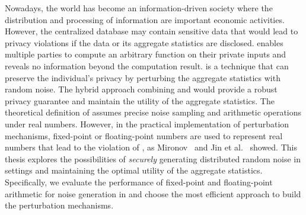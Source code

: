 Nowadays, the world has become an information-driven society where the distribution and processing of information are important economic activities.
However, the centralized database may contain sensitive data that would lead to privacy violations if the data or its aggregate statistics are disclosed.
\smpc enables multiple parties to compute an arbitrary function on their private inputs and reveals no information beyond the computation result.
\differentialprivacy is a technique that can preserve the individual's privacy by perturbing the aggregate statistics with random noise.
The hybrid approach combining \smpc and \differentialprivacy would provide a robust privacy guarantee and maintain the utility of the aggregate statistics.
The theoretical definition of \differentialprivacy assumes precise noise sampling and arithmetic operations under real numbers. However, in the practical implementation of perturbation mechanisms, fixed-point or floating-point numbers are used to represent real numbers that lead to the violation of \differentialprivacy, as Mironov~\cite{mironov2012significance} and Jin et al.~\cite{jin2022we} showed.
This thesis explores the possibilities of \textit{securely} generating distributed random noise in \smpc settings and maintaining the optimal utility of the aggregate statistics. Specifically, we evaluate the performance of fixed-point and floating-point arithmetic for noise generation in \smpc and choose the most efficient approach to build the perturbation mechanisms.








